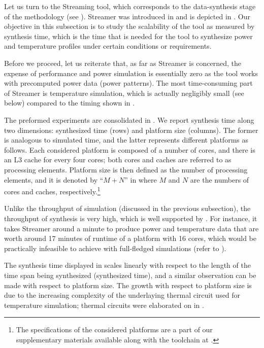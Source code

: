 
Let us turn to the Streaming tool, which corresponds to the data-synthesis stage
of the methodology (see ). Streamer was introduced in
 and is depicted in . Our objective in this
subsection is to study the scalability of the tool as measured by synthesis
time, which is the time that is needed for the tool to synthesize power and
temperature profiles under certain conditions or requirements.

Before we proceed, let us reiterate that, as far as Streamer is concerned, the
expense of performance and power simulation is essentially zero as the tool
works with precomputed power data (power patterns). The most time-consuming part
of Streamer is temperature simulation, which is actually negligibly small (see
below) compared to the timing shown in .

The preformed experiments are consolidated in . We report
synthesis time along two dimensions: synthesized time (rows) and platform size
(columns). The former is analogous to simulated time, and the latter represents
different platforms as follows. Each considered platform is composed of a number
of cores, and there is an L3 cache for every four cores; both cores and caches
are referred to as processing elements. Platform size is then defined as the
number of processing elements, and it is denoted by ``$M + N$'' in
 where $M$ and $N$ are the numbers of cores and caches,
respectively.\footnote{The specifications of the considered platforms are a part
of our supplementary materials available along with the toolchain at
\cite{sources}.}

Unlike the throughput of simulation (discussed in the previous subsection), the
throughput of synthesis is very high, which is well supported by
. For instance, it takes Streamer around a minute to produce
power and temperature data that are worth around 17 minutes of runtime of a
platform with 16 cores, which would be practically infeasible to achieve with
full-fledged simulations (refer to ).

The synthesis time displayed in  scales linearly with respect to
the length of the time span being synthesized (synthesized time), and a similar
observation can be made with respect to platform size. The growth with respect
to platform size is due to the increasing complexity of the underlaying thermal
 circuit used for temperature simulation; thermal circuits were
elaborated on in .
